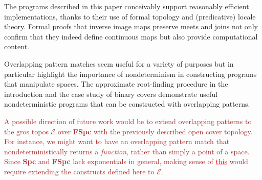 \documentclass[conference]{IEEEtran}
\newcommand{\grammar}[1]{\textcolor{red}{\underline{#1}}}
\newcommand{\FutureWork}[1]{\textcolor{brown}{#1}}
\begin{document}
The programs described in this paper conceivably support reasonably efficient implementations, thanks to their use of formal topology and (predicative) locale theory. Formal proofs that inverse image maps preserve meets and joins not only confirm that they indeed define continuous maps but also provide computational content.

Overlapping pattern matches seem useful for a variety of purposes but in particular highlight the  importance of nondeterminism in constructing programs that manipulate spaces. The approximate root-finding procedure in the introduction and the case study of binary covers demonstrate useful nondeterministic programs that can be constructed with overlapping patterns.


\FutureWork{A possible direction of future work would be to extend overlapping patterns to the gros topos $\mathcal{E}$ over \textbf{FSpc} with the previously described open cover topology. For instance, we might want to have an overlapping pattern match that nondeterministically returns a \emph{function}, rather than simply a point of a space. Since \textbf{Spc} and \textbf{FSpc} lack exponentials in general, making sense of \grammar{this} would require extending the constructs defined here to $\mathcal{E}$.}











%
%
%






\end{document}
